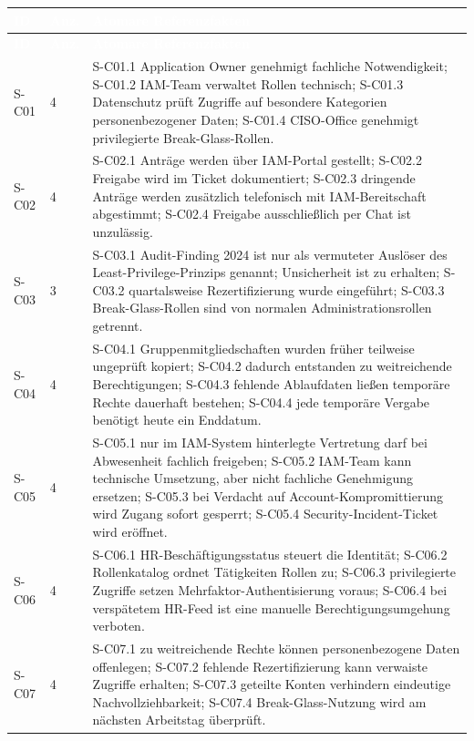 \documentclass[
  10pt,
  ngerman,
  a4paper,
  toc=graduated,
  numbers=noenddot,
  headings=standardclasses,
  nonumberlist
]{scrartcl}
\begin{document}
\footnotesize
\begin{longtable}{L{1.2cm}C{1.1cm}L{12.7cm}}
\toprule
{}
\textcolor{white}{\textbf{ID}} & \textcolor{white}{\textbf{Anz.}} & \textcolor{white}{\textbf{Atomare Referenzfakten}}\\
\midrule
\endfirsthead
\toprule
{}
\textcolor{white}{\textbf{ID}} & \textcolor{white}{\textbf{Anz.}} & \textcolor{white}{\textbf{Atomare Referenzfakten}}\\
\midrule
\endhead
S-C01 & 4 & S-C01.1 Application Owner genehmigt fachliche Notwendigkeit; S-C01.2 IAM-Team verwaltet Rollen technisch; S-C01.3 Datenschutz prüft Zugriffe auf besondere Kategorien personenbezogener Daten; S-C01.4 CISO-Office genehmigt privilegierte Break-Glass-Rollen.\\
S-C02 & 4 & S-C02.1 Anträge werden über IAM-Portal gestellt; S-C02.2 Freigabe wird im Ticket dokumentiert; S-C02.3 dringende Anträge werden zusätzlich telefonisch mit IAM-Bereitschaft abgestimmt; S-C02.4 Freigabe ausschließlich per Chat ist unzulässig.\\
S-C03 & 3 & S-C03.1 Audit-Finding 2024 ist nur als vermuteter Auslöser des Least-Privilege-Prinzips genannt; Unsicherheit ist zu erhalten; S-C03.2 quartalsweise Rezertifizierung wurde eingeführt; S-C03.3 Break-Glass-Rollen sind von normalen Administrationsrollen getrennt.\\
S-C04 & 4 & S-C04.1 Gruppenmitgliedschaften wurden früher teilweise ungeprüft kopiert; S-C04.2 dadurch entstanden zu weitreichende Berechtigungen; S-C04.3 fehlende Ablaufdaten ließen temporäre Rechte dauerhaft bestehen; S-C04.4 jede temporäre Vergabe benötigt heute ein Enddatum.\\
S-C05 & 4 & S-C05.1 nur im IAM-System hinterlegte Vertretung darf bei Abwesenheit fachlich freigeben; S-C05.2 IAM-Team kann technische Umsetzung, aber nicht fachliche Genehmigung ersetzen; S-C05.3 bei Verdacht auf Account-Kompromittierung wird Zugang sofort gesperrt; S-C05.4 Security-Incident-Ticket wird eröffnet.\\
S-C06 & 4 & S-C06.1 HR-Beschäftigungsstatus steuert die Identität; S-C06.2 Rollenkatalog ordnet Tätigkeiten Rollen zu; S-C06.3 privilegierte Zugriffe setzen Mehrfaktor-Authentisierung voraus; S-C06.4 bei verspätetem HR-Feed ist eine manuelle Berechtigungsumgehung verboten.\\
S-C07 & 4 & S-C07.1 zu weitreichende Rechte können personenbezogene Daten offenlegen; S-C07.2 fehlende Rezertifizierung kann verwaiste Zugriffe erhalten; S-C07.3 geteilte Konten verhindern eindeutige Nachvollziehbarkeit; S-C07.4 Break-Glass-Nutzung wird am nächsten Arbeitstag überprüft.\\

\end{longtable}
\end{document}
